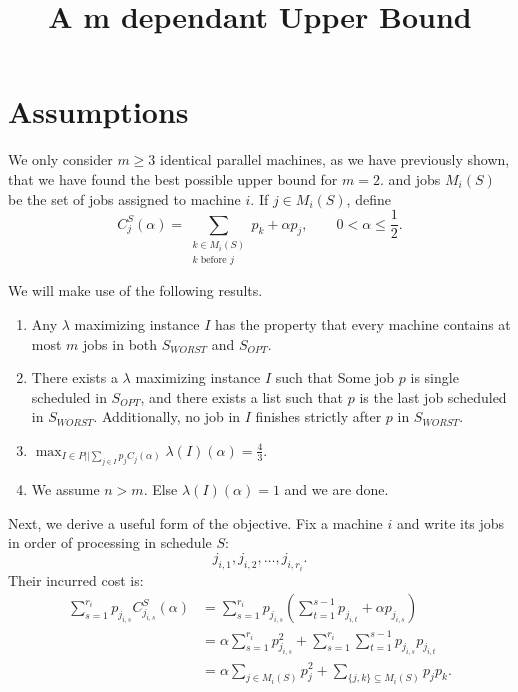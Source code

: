 \documentclass[11pt]{article}
\title{A m dependant Upper Bound}
\author{}
\date{}
\begin{document}
\maketitle

\section{Assumptions}

We only consider \(m\ge 3\) identical parallel machines, as we have previously shown, 
that we have found the best possible upper bound for $m=2$. and jobs
 \(M_i(S)\) be the set of jobs assigned to machine
\(i\).  If \(j\in M_i(S)\), define
\[
 C_j^S(\alpha)
 =
 \sum_{\substack{k\in M_i(S)\\k\text{ before }j}}p_k+\alpha p_j,
 \qquad 0<\alpha\le\frac12.
\]


We will make use of the following results.
\begin{enumerate}
 \item Any $\lambda$ maximizing instance $I$ has the property 
 that every machine contains at most \(m\) jobs in both $S_{WORST}$ and $S_{OPT}$.

 \item There exists a $\lambda$ maximizing instance $I$ such that 
 Some job \(p\) is single scheduled  in $S_{OPT}$, and there exists a list such that \(p\) is the
 last job scheduled in $S_{WORST}$.
 Additionally, no job in $I$ finishes strictly after $p$ in $S_{WORST}$.

 \item $\max_{I \in P||\sum_{j \in I}p_jC_j(\alpha)}\lambda(I)(\alpha) = \frac43$. 
 \item We assume $n > m$. Else $\lambda(I)(\alpha) =1$ and we are done. 

\end{enumerate}

Next, we derive a useful form of the objective.
Fix a machine $i$ and write its jobs in order of processing in schedule $S$:
\[
 j_{i,1},j_{i,2},\ldots,j_{i,r_i}.
\]
Their incurred cost is: 
\[
\begin{aligned}
\sum_{s=1}^{r_i}p_{j_{i,s}}C_{j_{i,s}}^S(\alpha)
&=
\sum_{s=1}^{r_i}
p_{j_{i,s}}
\left(
\sum_{t=1}^{s-1}p_{j_{i,t}}
+\alpha p_{j_{i,s}}
\right)\\
&=
\alpha\sum_{s=1}^{r_i}p_{j_{i,s}}^2
+
\sum_{s=1}^{r_i}\sum_{t=1}^{s-1}
p_{j_{i,s}}p_{j_{i,t}}\\
&=
\alpha\sum_{j\in M_i(S)}p_j^2
+
\sum_{\{j,k\}\subseteq M_i(S)}p_jp_k.
\end{aligned}
\]
\end{document}
